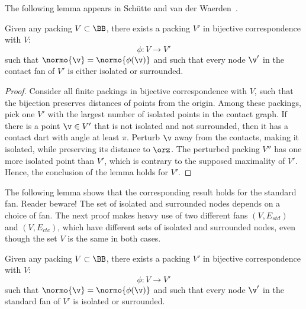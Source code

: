The following lemma appears in Sch\"utte and van der
Waerden~\cite{vanderWaerden:1951}.

\begin{lemma}[]
Given any packing $V\subset \BB$,
there exists a  packing $V'$ 
in bijective correspondence with $V$:
\begin{displaymath}
\phi:V\to V'
\end{displaymath}
such that $\normo{\v} = \normo{\phi(\v)}$ and
such that every node $\v'$ in the contact fan of $V'$
is either isolated or surrounded.
\end{lemma}
%
%
%

\begin{proof} Consider all finite packings in bijective correspondence
  with $V$, such that the bijection preserves distances of points from
  the origin.  Among these packings, pick one $V'$ with the largest
  number of isolated points in the contact graph.  If there is a point
  $\v\in V'$ that is not isolated and not surrounded, then it has a
  contact dart with angle at least $\pi$.  Perturb $\v$ away from the
  contacts, making it isolated, while preserving its distance to
  $\orz$.  The perturbed packing $V''$ has one more isolated point
  than $V'$, which is contrary to the supposed maximality of $V'$.
  Hence, the conclusion of the lemma holds for $V'$.
\end{proof}

The following lemma shows that the corresponding result holds for the
standard fan.  Reader beware!  The set of isolated and surrounded
nodes depends on a choice of fan.  The next proof makes heavy use
of two different fans $(V,E_{std})$ and $(V,E_{ctc})$, which have
different sets of isolated and surrounded nodes, even though the
set $V$ is the same in both cases.



\begin{lemma}[]
\label{lemma:surrounded}  %
Given any packing $V\subset \BB$,
there exists a  packing $V'$ 
in bijective correspondence with $V$:
\begin{displaymath}
\phi:V\to V'
\end{displaymath}
such that $\normo{\v} = \normo{\phi(\v)}$ and
such that every node $\v'$ in the standard fan of $V'$
is isolated or surrounded.
%
\end{lemma}


